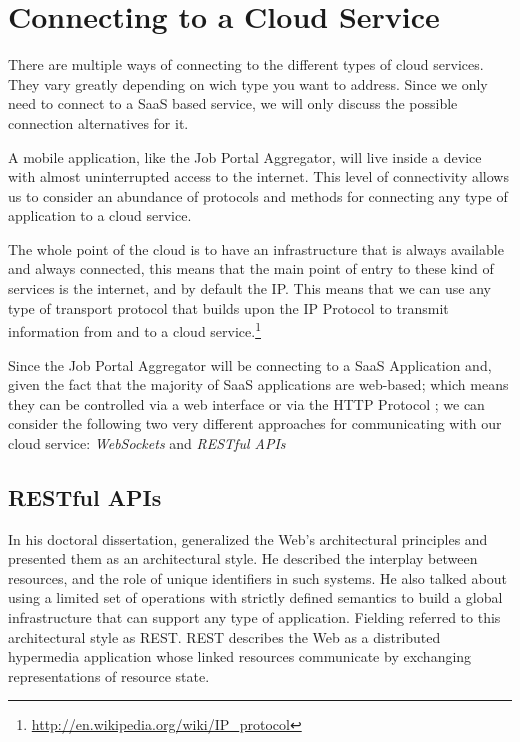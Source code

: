 \chapter{Connecting to a Cloud Service}\label{ch:introduction}

There are multiple ways of connecting to the different types of cloud services. They vary greatly depending on wich type you want to address. Since we only need to connect to a \ac{SaaS} based service, we will only discuss the possible connection alternatives for it.

A mobile application, like the Job Portal Aggregator, will live inside a device with almost uninterrupted access to the internet. This level of connectivity allows us to consider an abundance of protocols and methods for connecting any type of application to a cloud service.

The whole point of the cloud is to have an infrastructure that is always available and always connected, this means that the main point of entry to these kind of services is the internet, and by default the \ac{IP}. This means that we can use any type of transport protocol that builds upon the \ac{IP} Protocol to transmit information from and to a cloud service.\footnote{\url{http://en.wikipedia.org/wiki/IP_protocol}}  

Since the Job Portal Aggregator will be connecting to a \ac{SaaS} Application and, given the fact that the majority of \ac{SaaS} applications are web-based; which means they can be controlled via a web interface or via the HTTP Protocol \cite{mcwherter:2012}; we can consider the following two very different approaches for communicating with our cloud service: \textit{WebSockets} and \textit{RESTful APIs}

\section{RESTful APIs}
In his doctoral dissertation, \citeauthor{fielding:2000} generalized the Web's architectural principles and presented them as an architectural style. He described the interplay between resources, and the role of unique identifiers in such systems. He also talked about using a limited set of operations with strictly defined semantics to build a global infrastructure that can support any type of application. Fielding referred to this architectural style as \ac{REST}. \ac{REST} describes the Web as a distributed hypermedia application whose linked resources communicate by exchanging representations of resource state. \cite{webber:2010}

